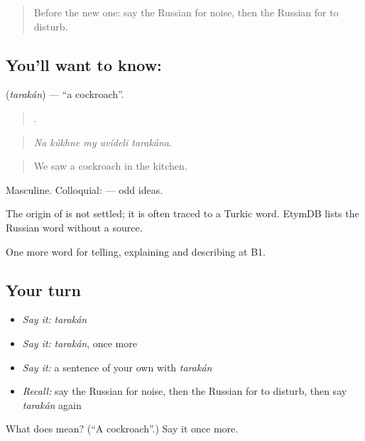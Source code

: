 \begin{quote}
Before the new one: say the Russian for noise, then the Russian for to disturb.
\end{quote}

\subsection*{You'll want to know: }
\textbf{} (\emph{tarakán}) — \textquotedblleft{}a cockroach\textquotedblright{}.

\begin{quote}
    .
\end{quote}

\begin{quote}
\emph{Na kúkhne my uvídeli tarakána.}
\end{quote}

\begin{quote}
We saw a cockroach in the kitchen.
\end{quote}

Masculine. Colloquial: \emph{  } — odd ideas.

\begin{cousinweb}
The origin of \emph{} is not settled; it is often traced to a Turkic word. EtymDB lists the Russian word without a source.
\end{cousinweb}

\begin{grammarlens}[title={What you've built}]
One more word for telling, explaining and describing at B1.
\end{grammarlens}

\subsection*{Your turn}
\begin{itemize}
\raggedright
  \item \emph{Say it:} \emph{tarakán}
  \item \emph{Say it:} \emph{tarakán}, once more
  \item \emph{Say it:} a sentence of your own with \emph{tarakán}
  \item \emph{Recall:} say the Russian for noise, then the Russian for to disturb, then say \emph{tarakán} again
\end{itemize}

\begin{tcolorbox}[breakable,colback=teal!4,colframe=teal!35!black,title={Before you move on}]
What does  mean? (\textquotedblleft{}A cockroach\textquotedblright{}.) Say it once more.
\end{tcolorbox}
